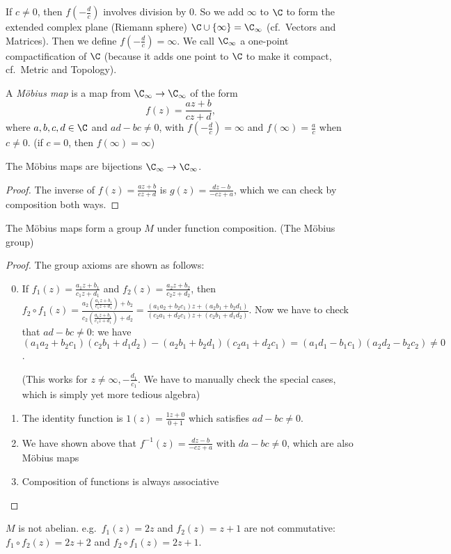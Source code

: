 \documentclass[a4paper]{article}
\begin{document}
If $c\not=0$, then $f(-\frac{d}{c})$ involves division by 0. So we add $\infty$ to $\C$ to form the extended complex plane (Riemann sphere) $\C\cup \{\infty\}= \C_\infty$ (cf.\ Vectors and Matrices). Then we define $f(-\frac{d}{c}) = \infty$. We call $\C_\infty$ a one-point compactification of $\C$ (because it adds one point to $\C$ to make it compact, cf.\ Metric and Topology).

\begin{defi}
  A \emph{M\"obius map} is a map from $\C_\infty \to \C_\infty$ of the form
  \[
    f(z) = \frac{az + b}{cz + d},
  \]
  where $a, b, c, d\in \C$ and $ad - bc\not= 0$, with $f(-\frac{d}{c}) = \infty$ and $f(\infty) = \frac{a}{c}$ when $c\not= 0$. (if $c = 0$, then $f(\infty)=\infty$)
\end{defi}

\begin{lemma}
  The M\"obius maps are bijections $\C_\infty \to \C_\infty$.
\end{lemma}

\begin{proof}
  The inverse of $f(z) = \frac{az + b}{cz+ d}$ is $g(z) = \frac{dz - b}{-cz + a}$, which we can check by composition both ways.
\end{proof}

\begin{prop}
  The M\"obius maps form a group $M$ under function composition. (The M\"obius group)
\end{prop}
\begin{proof}
  The group axioms are shown as follows:
  \begin{enumerate}[label=\arabic{*}.]
      \setcounter{enumi}{-1}
    \item If $f_1(z) = \frac{a_1z + b_1}{c_1z + d_1}$ and $f_2(z) = \frac{a_2z + b_2}{c_2 z + d_2}$, then $\displaystyle f_2\circ f_1 (z) = \frac{a_2\left(\frac{a_1z + b_1}{c_1z + d_1}\right) + b_2}{c_2\left(\frac{a_1z + b_1}{c_1z + d_1}\right) + d_2} = \frac{(a_1a_2 + b_2c_1)z + (a_2b_1 + b_2d_1)}{(c_2a_1 + d_2c_1)z + (c_2b_1 + d_1d_2)}$. Now we have to check that $ad - bc \not = 0$: we have $(a_1a_2 + b_2c_1)(c_2b_1 + d_1d_2) - (a_2b_1 + b_2d_1)(c_2a_1 + d_2c_1) = (a_1d_1 - b_1c_1)(a_2d_2 - b_2c_2)\not =0 $.

      (This works for $z\not= \infty, -\frac{d_1}{c_1}$. We have to manually check the special cases, which is simply yet more tedious algebra)
    \item The identity function is $1(z) = \frac{1z + 0}{0 + 1}$ which satisfies $ad - bc \not= 0$.
    \item We have shown above that $f^{-1}(z) = \frac{dz - b}{-cz + a}$ with $da - bc\not= 0$, which are also M\"obius maps
    \item Composition of functions is always associative
  \end{enumerate}
\end{proof}
$M$ is not abelian. e.g.\ $f_1(z) = 2z$ and $f_2(z) = z + 1$ are not commutative: $f_1\circ f_2(z) = 2z+2$ and $f_2\circ f_1(z) = 2z + 1$.
\end{document}
